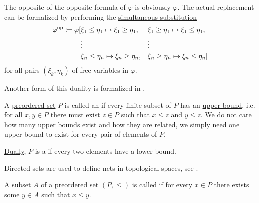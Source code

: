 \begin{definition}
\begin{thmenum}
    The opposite of the opposite formula of \( \varphi \) is obviously \( \varphi \). The actual replacement can be formalized by performing the \hyperref[def:first_order_substitution/term_in_formula]{simultaneous substitution}
    \begin{equation*}
      \begin{aligned}
        \varphi^{\operatorname{op}} \coloneqq \varphi[
          &\xi_1 \leq \eta_1 \mapsto \xi_1 \geq \eta_1, &&\xi_1 \geq \eta_1 \mapsto \xi_1 \leq \eta_1, \\
          &\vdots                                       &&\vdots \\
          &\xi_n \leq \eta_n \mapsto \xi_n \geq \eta_n, &&\xi_n \geq \eta_n \mapsto \xi_n \leq \eta_n]
      \end{aligned}
    \end{equation*}
    for all pairs \( (\xi_k, \eta_k) \) of free variables in \( \varphi \).

    Another form of this duality is formalized in .
  \end{thmenum}
\end{definition}

\begin{definition}\label{def:directed_set}
  A \hyperref[def:preordered_set]{preordered set} \( P \) is called an  if every finite subset of \( P \) has an \hyperref[def:partially_ordered_set_extremal_points/upper_and_lower_bounds]{upper bound}, i.e. for all \( x, y \in P \) there must exist \( z \in P \) such that \( x \leq z \) and \( y \leq z \). We do not care how many upper bounds exist and how they are related, we simply need one upper bound to exist for every pair of elements of \( P \).

  \hyperref[def:preordered_set/duality]{Dually}, \( P \) is a  if every two elements have a lower bound.

  Directed sets are used to define nets in topological spaces, see .
\end{definition}

\begin{definition}\label{def:cofinal_set}
  A subset \( A \) of a preordered set \( (P, \leq) \) is called  if for every \( x \in P \) there exists some \( y \in A \) such that \( x \leq y \).
\end{definition}

